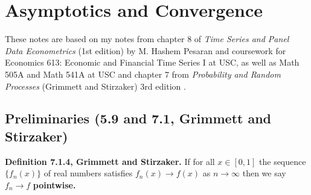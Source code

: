 %
%
%
%
%
%
%
%
%
%
%
%
%
%
%
\section{Asymptotics and Convergence}

These notes are based on my notes from chapter 8 of \textit{Time Series and Panel Data Econometrics} (1st edition) by M. Hashem Pesaran \citep{pesaran-2015-text} and coursework for Economics 613: Economic and Financial Time Series I at USC, as well as Math 505A and Math 541A at USC and chapter 7 from \textit{Probability and Random Processes} (Grimmett and Stirzaker) 3rd edition \citep{grimmett2001probability}.


\subsection{Preliminaries (5.9 and 7.1, Grimmett and Stirzaker)}
\label{asym.preliminaries}

\begin{definition} \textbf{Definition 7.1.4, Grimmett and Stirzaker.} If for all \(x \in [0, 1]\) the sequence \(\{f_n(x)\}\) of real numbers satisfies \(f_n(x) \to f(x)\) as \(n \to \infty\) then we say \(f_n \to f\) \textbf{pointwise.}
\end{definition} 

